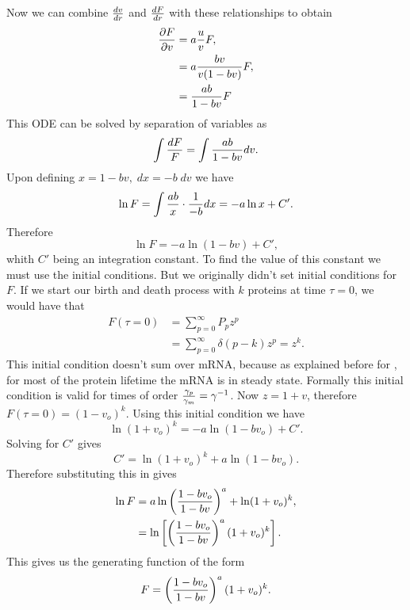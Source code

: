 Now we can combine ${dv \over dr}$ and ${dF \over dr}$ with these relationships
to obtain
\begin{align}
  {\partial F \over \partial v} &= a {u \over v} F, \\
  &= a {b v \over v (1 - b v)} F, \\
  &= {a b \over 1 - b v} F
\end{align}
This ODE can be solved by separation of variables as
\begin{equation}
  \int {dF \over F} = \int {a b \over 1 - b v} dv.
\end{equation}
Upon defining $x = 1 - b v, \; dx = - b\; dv$ we have
\begin{equation}
  \ln F = \int {a b \over x} \cdot {1 \over -b} dx = -a \ln x + C'.
\end{equation}
Therefore
\begin{equation}
  \ln F = -a \ln (1 - b v) + C',
  \label{eq_lnF_constant}
\end{equation}
whith $C'$ being an integration constant. To find the value of this constant
we must use the initial conditions. But we originally didn't set initial
conditions for $F$. If we start our birth and death process with $k$ proteins
at time $\tau = 0$, we would have that
\begin{align}
  F(\tau = 0) &= \sum_{p=0}^{\infty}P_p z^p\\
  &= \sum_{p=0}^{\infty} \delta (p - k) z^p = z^k.
\end{align}
This initial condition doesn't sum over mRNA, because as explained before for
, for most of the protein lifetime the mRNA is in steady
state. Formally this initial condition is valid for times of order
${\gamma_p \over \gamma_m} = \gamma^{-1}$. Now $z = 1 + v$, therefore
$F(\tau = 0) = (1 - v_o)^k$. Using this initial condition we have
\begin{equation}
  \ln (1 + v_o)^k = -a \ln (1 - b v_o) + C'.
\end{equation}
Solving for $C'$ gives
\begin{equation}
  C' = \ln (1 + v_o)^k + a \ln (1 - b v_o).
\end{equation}
Therefore substituting this in  gives
\begin{align}
  \ln F &= a \ln \left( {1 - b v_o \over 1 - b v} \right)^a
  + \ln (1 + v_o)^k,\\
  &= \ln \left[ \left( {1 - b v_o \over 1 - b v} \right)^a
  (1 + v_o)^k \right].
\end{align}
This gives us the generating function of the form
\begin{equation}
  F =   \left( {1 - b v_o \over 1 - b v} \right)^a
  (1 + v_o)^k .
  \label{eq_generating_function_onv}
\end{equation}

